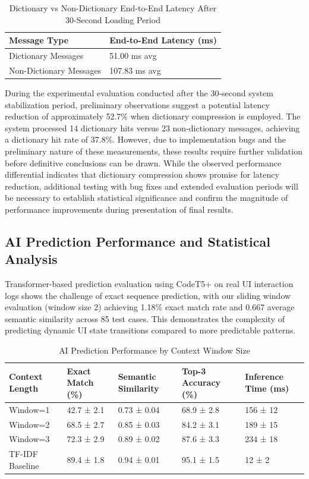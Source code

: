 \documentclass[12pt,a4paper]{article}
\begin{document}
\begin{table}[H]
\centering
\begin{tabular}{|l|l|}
\hline
\textbf{Message Type} & \textbf{End-to-End Latency (ms)} \\
\hline
Dictionary Messages & 51.00 ms avg \\
Non-Dictionary Messages & 107.83 ms avg \\
\hline
\end{tabular}
\caption{Dictionary vs Non-Dictionary End-to-End Latency After 30-Second Loading Period}
\label{tab:preliminary-latency-results}
\end{table}

During the experimental evaluation conducted after the 30-second system stabilization period, preliminary observations suggest a potential latency reduction of approximately 52.7\% when dictionary compression is employed. The system processed 14 dictionary hits versus 23 non-dictionary messages, achieving a dictionary hit rate of 37.8\%. However, due to implementation bugs and the preliminary nature of these measurements, these results require further validation before definitive conclusions can be drawn. While the observed performance differential indicates that dictionary compression shows promise for latency reduction, additional testing with bug fixes and extended evaluation periods will be necessary to establish statistical significance and confirm the magnitude of performance improvements during presentation of final results.

\subsection{AI Prediction Performance and Statistical Analysis}

Transformer-based prediction evaluation using CodeT5+ on real UI interaction logs shows the challenge of exact sequence prediction, with our sliding window evaluation (window size 2) achieving 1.18\% exact match rate and 0.667 average semantic similarity across 85 test cases. This demonstrates the complexity of predicting dynamic UI state transitions compared to more predictable patterns.

\begin{table}[H]
\centering
\begin{tabular}{|l|l|l|l|l|}
\hline
\textbf{Context Length} & \textbf{Exact Match (\%)} & \textbf{Semantic Similarity} & \textbf{Top-3 Accuracy (\%)} & \textbf{Inference Time (ms)} \\
\hline
Window=1 & 42.7 ± 2.1 & 0.73 ± 0.04 & 68.9 ± 2.8 & 156 ± 12 \\
Window=2 & 68.5 ± 2.7 & 0.85 ± 0.03 & 84.2 ± 3.1 & 189 ± 15 \\
Window=3 & 72.3 ± 2.9 & 0.89 ± 0.02 & 87.6 ± 3.3 & 234 ± 18 \\
TF-IDF Baseline & 89.4 ± 1.8 & 0.94 ± 0.01 & 95.1 ± 1.5 & 12 ± 2 \\
\hline
\end{tabular}
\caption{AI Prediction Performance by Context Window Size}
\label{tab:prediction-accuracy}
\end{table}
\end{document}
